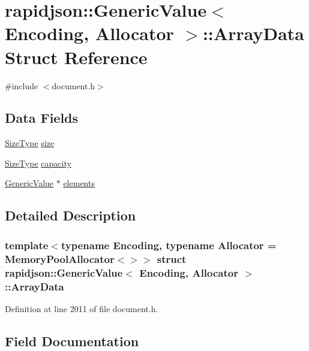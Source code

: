 \hypertarget{structrapidjson_1_1_generic_value_1_1_array_data}{}\section{rapidjson\+::Generic\+Value$<$ Encoding, Allocator $>$\+::Array\+Data Struct Reference}
\label{structrapidjson_1_1_generic_value_1_1_array_data}


{\ttfamily \#include $<$document.\+h$>$}

\subsection*{Data Fields}
\begin{DoxyCompactItemize}
\item 
\mbox{\hyperlink{namespacerapidjson_a44eb33eaa523e36d466b1ced64b85c84}{Size\+Type}} \mbox{\hyperlink{structrapidjson_1_1_generic_value_1_1_array_data_a86f04ea890c25b448dc577ec6fe1e737}{size}}
\item 
\mbox{\hyperlink{namespacerapidjson_a44eb33eaa523e36d466b1ced64b85c84}{Size\+Type}} \mbox{\hyperlink{structrapidjson_1_1_generic_value_1_1_array_data_a0011f5bde8f96b35522cdcc8622b1f7b}{capacity}}
\item 
\mbox{\hyperlink{classrapidjson_1_1_generic_value}{Generic\+Value}} $\ast$ \mbox{\hyperlink{structrapidjson_1_1_generic_value_1_1_array_data_a01391819fc813854b808391933be424d}{elements}}
\end{DoxyCompactItemize}


\subsection{Detailed Description}
\subsubsection*{template$<$typename Encoding, typename Allocator = Memory\+Pool\+Allocator$<$$>$$>$\newline
struct rapidjson\+::\+Generic\+Value$<$ Encoding, Allocator $>$\+::\+Array\+Data}



Definition at line 2011 of file document.\+h.



\subsection{Field Documentation}
\mbox{\label{structrapidjson_1_1_generic_value_1_1_array_data_a0011f5bde8f96b35522cdcc8622b1f7b}} 
